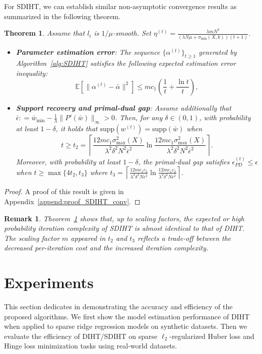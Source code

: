 \documentclass[11pt]{article}
\newtheorem{theorem}{Theorem}
\newtheorem{remark}{Remark}
\newcommand{\supp}{\text{supp}}
\numberwithin{equation}{section}
\numberwithin{table}{section}
\numberwithin{figure}{section}
\begin{document}
For SDIHT, we can establish similar non-asymptotic convergence results as summarized in the following theorem.
\begin{theorem}\label{thrm:SDIHT_Conv}
Assume that $l_i$ is $1/\mu$-smooth. Set $\eta^{(t)} = \frac{\lambda m N^2}{(\lambda N \mu + \sigma_{\min}(X,k))(t+1)}$.
\begin{itemize}
  \item[(a)] \emph{\textbf{Parameter estimation error}:} The sequence $\{\alpha^{(t)}\}_{t\ge 1}$ generated by Algorithm~\ref{alg:SDIHT} satisfies the following expected estimation error inequality:
\[
\mathbb{E}[\|\alpha^{(t)} - \bar\alpha\|^2] \le m c_1\left(\frac{1}{t}  + \frac{\ln t}{t}\right),
\]
\item[(b)] \emph{\textbf{Support recovery and primal-dual gap}:} Assume additionally that $\bar\epsilon: = \bar w_{\min} - \frac{1}{\lambda} \|P'(\bar w)\|_\infty >0$. Then, for any $\delta \in (0,1)$, with probability at least $1-\delta$, it holds that $\supp(w^{(t)})= \supp(\bar w)$ when
  \[
t \ge t_2= \left\lceil\frac{12mc_1\sigma_{\max}^2(X)}{\lambda^2\delta^2 N^2 \bar\epsilon^2} \ln \frac{12mc_1\sigma_{\max}^2(X)}{\lambda^2\delta^2 N^2 \bar\epsilon^2}\right\rceil.
\]
Moreover, with probability at least $1-\delta$, the primal-dual gap satisfies $\epsilon_{PD}^{(t)} \le \epsilon$ when $t \ge \max\{4t_2, t_3\}$ where $ t_3= \left\lceil\frac{12mc_1c_2}{\lambda^2\delta^2 N\epsilon^2} \ln \frac{12mc_1c_2}{\lambda^2\delta^2 N \epsilon^2}\right\rceil$.
\end{itemize}
\end{theorem}
\begin{proof}
A proof of this result is given in Appendix~\ref{append:proof_SDIHT_conv}.
\end{proof}
\begin{remark}
Theorem~\ref{thrm:SDIHT_Conv} shows that, up to scaling factors, the expected or high probability iteration complexity of SDIHT is almost identical to that of DIHT. The scaling factor $m$ appeared in $t_2$ and $t_3$ reflects a trade-off between the decreased per-iteration cost and the increased iteration complexity.
\end{remark}

\section{Experiments}

This section dedicates in demonstrating the accuracy and efficiency of the proposed algorithms. We first show the model estimation performance of DIHT when applied to sparse ridge regression models on synthetic datasets. Then we evaluate the efficiency of DIHT/SDIHT on sparse $\ell_2$-regularized Huber loss and Hinge loss minimization tasks using real-world datasets.
\end{document}
